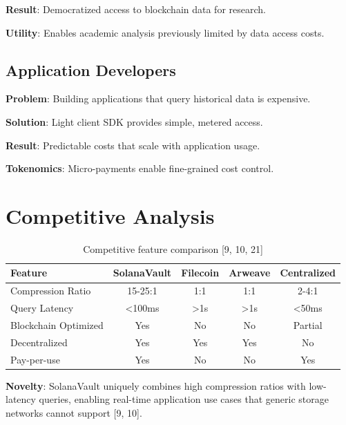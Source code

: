 \documentclass[12pt,a4paper]{article}
\begin{document}
\textbf{Result}: Democratized access to blockchain data for research.

\noindent\textbf{Utility}: Enables academic analysis previously limited by data access costs.

\subsection{Application Developers}

\textbf{Problem}: Building applications that query historical data is expensive.

\textbf{Solution}: Light client SDK provides simple, metered access.

\textbf{Result}: Predictable costs that scale with application usage.

\noindent\textbf{Tokenomics}: Micro-payments enable fine-grained cost control.

\section{Competitive Analysis}

\begin{table}[h]
\centering
\begin{tabular}{@{}lcccc@{}}
\toprule
\textbf{Feature} & \textbf{SolanaVault} & \textbf{Filecoin} & \textbf{Arweave} & \textbf{Centralized} \\
\midrule
Compression Ratio & 15-25:1 & 1:1 & 1:1 & 2-4:1 \\
Query Latency & <100ms & >1s & >1s & <50ms \\
Blockchain Optimized & Yes & No & No & Partial \\
Decentralized & Yes & Yes & Yes & No \\
Pay-per-use & Yes & No & No & Yes \\
\bottomrule
\end{tabular}
\caption{Competitive feature comparison [9, 10, 21]}
\end{table}

\noindent\textbf{Novelty}: SolanaVault uniquely combines high compression ratios with low-latency queries, enabling real-time application use cases that generic storage networks cannot support [9, 10].

\end{document}
